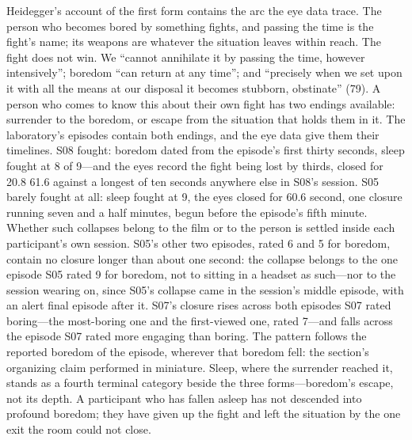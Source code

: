 Heidegger's account of the first form contains the arc the eye data trace. The person who
becomes bored by something fights, and passing the time is the fight's name; its weapons are
whatever the situation leaves within reach. The fight does not win. We ``cannot annihilate it
by passing the time, however intensively''; boredom ``can return at any time''; and
``precisely when we set upon it with all the means at our disposal it becomes stubborn,
obstinate'' (79). A person who comes to know this about their own fight has two endings
available: surrender to the boredom, or escape from the situation that holds them in it. The
laboratory's episodes contain both endings, and the eye data give them their timelines. S08
fought: boredom dated from the episode's first thirty seconds, sleep fought at 8 of 9---and
the eyes record the fight being lost by thirds, closed for 20.8%
61.6%
against a longest of ten seconds anywhere else in S08's session. S05 barely fought at all:
sleep fought at 9, the eyes closed for 60.6%
second, one closure running seven and a half minutes, begun before the episode's fifth minute.
Whether such collapses belong to the film or to the person is settled inside each participant's
own session. S05's other two episodes, rated 6 and 5 for boredom, contain no closure longer
than about one second: the collapse belongs to the one episode S05 rated 9 for boredom, not to
sitting in a headset as such---nor to the session wearing on, since S05's collapse came in the
session's middle episode, with an alert final episode after it. S07's closure rises across both
episodes S07 rated boring---the most-boring one and the first-viewed one, rated 7---and falls
across the episode S07 rated more engaging than boring. The pattern follows the reported
boredom of the episode, wherever that boredom fell: the section's organizing claim performed
in miniature. Sleep, where the surrender reached it, stands as a fourth terminal category
beside the three forms---boredom's escape, not its depth. A participant who has fallen asleep
has not descended into profound boredom; they have given up the fight and left the situation
by the one exit the room could not close.


